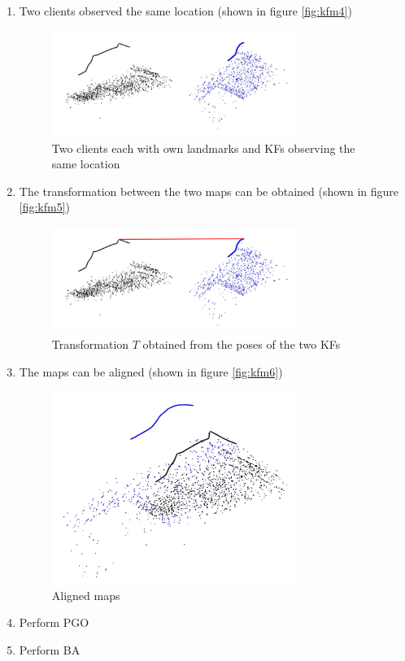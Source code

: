 \begin{enumerate}
  \item {Two clients observed the same location (shown in figure \autoref{fig:kfm4})
    \begin{figure}[H]
      \centering
      \includegraphics[width=0.75\textwidth]{images/map_1_2_1}
      \caption{Two clients each with own landmarks and \acp{KF} observing the same location}
      \label{fig:kfm4}
    \end{figure}}
  \item {The transformation between the two maps can be obtained (shown in figure \autoref{fig:kfm5})
    \begin{figure}[H]
      \centering
      \includegraphics[width=0.75\textwidth]{images/map_1_2_2}
      \caption{Transformation $T$ obtained from the poses of the two \acp{KF}}
      \label{fig:kfm5}
    \end{figure}}
  \item {The maps can be aligned (shown in figure \autoref{fig:kfm6})
    \begin{figure}[H]
      \centering
      \includegraphics[width=0.75\textwidth]{images/map_1_2_merge}
      \caption{Aligned maps}
      \label{fig:kfm6}
    \end{figure}}
  \item Perform \acf{PGO}
  \item Perform \acf{BA}
\end{enumerate}


